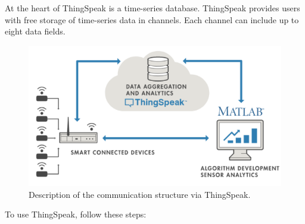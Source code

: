 \documentclass[10pt,a4paper,onecolumn]{article}
\begin{document}
At the heart of ThingSpeak is a time-series database. ThingSpeak
provides users with free storage of time-series data in channels. Each
channel can include up to eight data fields.

\begin{figure}[H]
  \begin{center}
    \includegraphics[width=\dimexpr\textwidth-1cm\relax,height=\dimexpr0.25\textheight-1cm\relax,keepaspectratio]{images/ThingSpeak.png}
    \caption{Description of the communication structure via ThingSpeak.}
    \label{fig:thingspeak}
  \end{center}
\end{figure}

To use ThingSpeak, follow these steps:
\end{document}
